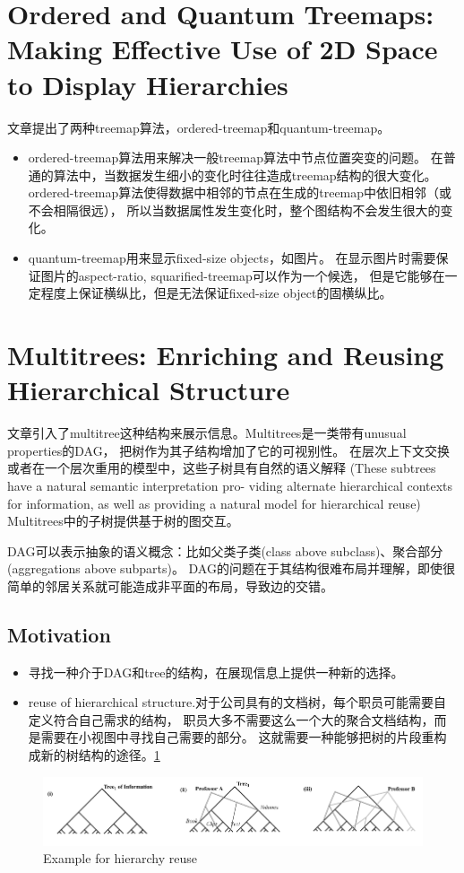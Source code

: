 \documentclass{article}
\begin{document}
	\section{Ordered and Quantum Treemaps: Making Effective Use of
		2D Space to Display Hierarchies\cite{Bederson2002}}
		文章提出了两种treemap算法，ordered-treemap和quantum-treemap。
		\begin{itemize}
			\item ordered-treemap算法用来解决一般treemap算法中节点位置突变的问题。
				在普通的算法中，当数据发生细小的变化时往往造成treemap结构的很大变化。
				ordered-treemap算法使得数据中相邻的节点在生成的treemap中依旧相邻（或不会相隔很远），
				所以当数据属性发生变化时，整个图结构不会发生很大的变化。
			\item quantum-treemap用来显示fixed-size objects，如图片。
				在显示图片时需要保证图片的aspect-ratio, squarified-treemap可以作为一个候选，
				但是它能够在一定程度上保证横纵比，但是无法保证fixed-size object的固横纵比。
		\end{itemize}

		\section{Multitrees: Enriching and Reusing Hierarchical Structure\cite{Furnas1994}}
		文章引入了multitree这种结构来展示信息。Multitrees是一类带有unusual properties的DAG，
		把树作为其子结构增加了它的可视别性。
		在层次上下文交换或者在一个层次重用的模型中，这些子树具有自然的语义解释
		(These subtrees have a natural semantic interpretation pro- viding alternate hierarchical contexts for information, as well as providing a natural model for hierarchical reuse)
		Multitrees中的子树提供基于树的图交互。

		DAG可以表示抽象的语义概念：比如父类子类(class above subclass)、聚合部分(aggregations above subparts)。
		DAG的问题在于其结构很难布局并理解，即使很简单的邻居关系就可能造成非平面的布局，导致边的交错。
		\subsection{Motivation}

		\begin{itemize}
			\item 寻找一种介于DAG和tree的结构，在展现信息上提供一种新的选择。
			\item reuse of hierarchical structure.对于公司具有的文档树，每个职员可能需要自定义符合自己需求的结构，
				职员大多不需要这么一个大的聚合文档结构，而是需要在小视图中寻找自己需要的部分。
				这就需要一种能够把树的片段重构成新的树结构的途径。\ref{fig:multitree_1}
		\end{itemize}
		\begin{figure}[h]
			\centering
			\includegraphics[width=\textwidth]{_img/Multitrees_1.png}
			\caption{Example for hierarchy reuse}
			\label{fig:multitree_1}
		\end{figure}
\end{document}
